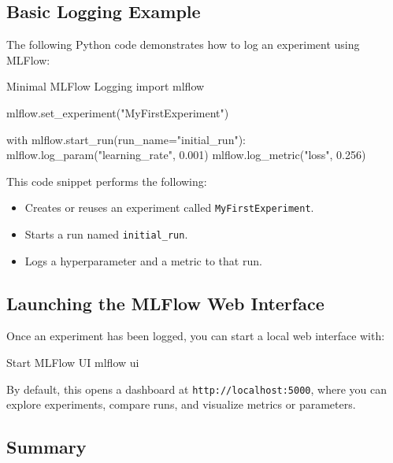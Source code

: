 %
\subsection{Basic Logging Example}

The following Python code demonstrates how to log an experiment using MLFlow:

\begin{codeonly}{Minimal MLFlow Logging}
import mlflow

mlflow.set_experiment("MyFirstExperiment")

with mlflow.start_run(run_name="initial_run"):
    mlflow.log_param("learning_rate", 0.001)
    mlflow.log_metric("loss", 0.256)
\end{codeonly}

This code snippet performs the following:
\begin{itemize}
    \item Creates or reuses an experiment called \texttt{MyFirstExperiment}.
    \item Starts a run named \texttt{initial\_run}.
    \item Logs a hyperparameter and a metric to that run.
\end{itemize}

%
\subsection{Launching the MLFlow Web Interface}

Once an experiment has been logged, you can start a local web interface with:

\begin{codeonly}{Start MLFlow UI}
mlflow ui
\end{codeonly}

By default, this opens a dashboard at \texttt{http://localhost:5000}, where you can explore experiments, compare runs, and visualize metrics or parameters.

%
\subsection{Summary}

